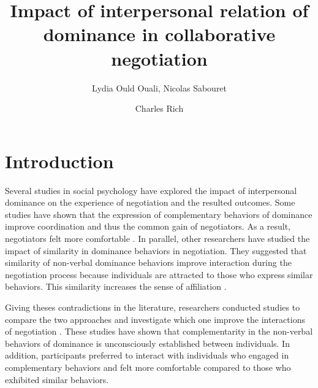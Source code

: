 \documentclass{llncs}
\begin{document}
	\title{\vskip -10pt Impact of interpersonal relation of dominance in collaborative negotiation}
	
	\author{Lydia Ould Ouali,  Nicolas Sabouret\and
		Charles Rich }
	
	
	\maketitle
	
	\section{Introduction}
	
	
	Several studies in social psychology have explored the impact of interpersonal dominance on the experience of negotiation and the resulted outcomes. Some studies have shown that the expression of complementary behaviors of dominance improve coordination and thus the common gain of negotiators. As a result, negotiators felt more comfortable \cite{tiedens2003power,wiltermuth2009benefits,olekalns2013dyadic}. 
	In parallel, other researchers have studied the impact of similarity in dominance behaviors in negotiation. They suggested that similarity of non-verbal dominance behaviors improve interaction during the negotiation process because individuals are attracted to those who express similar behaviors. This similarity increases the sense of affiliation \cite{olekalns2013dyadic}.
	
	Giving theses contradictions in the literature, researchers conducted studies to compare the two approaches and investigate which one improve the interactions of negotiation \cite{tiedens2003power,dryer1997opposites}. These studies have shown that complementarity in the non-verbal behaviors of dominance is unconsciously established between individuals. In addition, participants preferred to interact with individuals who engaged in complementary behaviors and felt more comfortable compared to those who exhibited similar behaviors.
	
\end{document}
